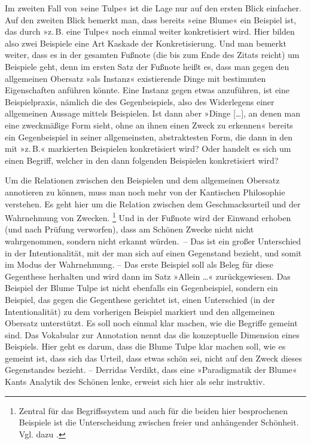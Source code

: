 \documentclass{article}
\renewcommand*{\see}{\autocap{v}gl\adddot}%
\begin{document}
Im zweiten Fall von »eine Tulpe« ist die Lage nur auf den ersten Blick
einfacher. Auf den zweiten Blick bemerkt man, dass bereits »eine
Blume« ein Beispiel ist, das durch »z.\,B. eine Tulpe« noch einmal
weiter konkretisiert wird. Hier bilden also zwei Beispiele eine Art
Kaskade der Konkretisierung. Und man bemerkt weiter, dass es in der
gesamten Fußnote (die bis zum Ende des Zitats reicht) um Beispiele
geht, denn im ersten Satz der Fußnote heißt es, dass man gegen den
allgemeinen Obersatz »als Instanz« existierende Dinge mit bestimmten
Eigenschaften anführen könnte. Eine Instanz gegen etwas anzuführen,
ist eine Beispielpraxis, nämlich die des Gegenbeispiels, also des
Widerlegens einer allgemeinen Aussage mittels Beispielen. Ist dann
aber »Dinge […], an denen man eine zweckmäßige Form sieht, ohne an
ihnen einen Zweck zu erkennen« bereits ein Gegenbeispiel in seiner
allgemeinsten, abstraktesten Form, die dann in den mit »z.\,B.«
markierten Beispielen konkretisiert wird? Oder handelt es sich um
einen Begriff, welcher in den dann folgenden Beispielen konkretisiert
wird?

Um die Relationen zwischen den Beispielen und dem allgemeinen Obersatz
annotieren zu können, muss man noch mehr von der Kantischen
Philosophie verstehen. Es geht hier um die Relation zwischen dem
Geschmacksurteil und der Wahrnehmung von Zwecken.%
\footnote{Zentral für das Begriffssystem und auch für die beiden hier
  besprochenen Beispiele ist die Unterscheidung zwischen freier und
  anhängender Schönheit. Vgl. dazu \textcite{Guesken2018a}.} %
Und in der Fußnote wird der Einwand erhoben (und nach Prüfung
verworfen), dass am Schönen Zwecke nicht
nicht %
wahrgenommen, sondern nicht erkannt würden.~-- Das ist ein großer
Unterschied in der Intentionalität, mit der man sich auf einen
Gegenstand bezieht, und somit im Modus der Wahrnehmung. -- Das erste
Beispiel soll als Beleg für diese Gegenthese herhalten und wird dann
im Satz »Allein …« zurückgewiesen. Das Beispiel der Blume Tulpe ist
nicht ebenfalls ein Gegenbeispiel, sondern ein Beispiel, das gegen die
Gegenthese gerichtet ist, einen Unterschied (in der Intentionalität)
zu dem vorherigen Beispiel markiert und den allgemeinen Obersatz
unterstützt. Es soll noch einmal klar machen, wie die Begriffe gemeint
sind. Das Vokabular zur Annotation nennt das die konzeptuelle
Dimension eines Beispiels. \Parencite[\see\ auch][]{CL2013b} Hier geht
es darum, dass die Blume Tulpe klar machen soll, wie es gemeint ist,
dass sich das Urteil, dass etwas schön sei, nicht auf den Zweck dieses
Gegenstandes bezieht. -- Derridas Verdikt, dass eine »Paradigmatik der
Blume« Kants Analytik des Schönen lenke, erweist sich hier als sehr
instruktiv.
\end{document}
